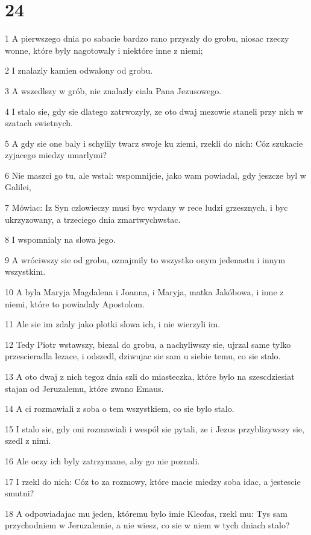 \chapter{24}

\par 1 A pierwszego dnia po sabacie bardzo rano przyszly do grobu, niosac rzeczy wonne, które byly nagotowaly i niektóre inne z niemi;
\par 2 I znalazly kamien odwalony od grobu.
\par 3 A wszedlszy w grób, nie znalazly ciala Pana Jezusowego.
\par 4 I stalo sie, gdy sie dlatego zatrwozyly, ze oto dwaj mezowie staneli przy nich w szatach swietnych.
\par 5 A gdy sie one baly i schylily twarz swoje ku ziemi, rzekli do nich: Cóz szukacie zyjacego miedzy umarlymi?
\par 6 Nie maszci go tu, ale wstal: wspomnijcie, jako wam powiadal, gdy jeszcze byl w Galilei,
\par 7 Mówiac: Iz Syn czlowieczy musi byc wydany w rece ludzi grzesznych, i byc ukrzyzowany, a trzeciego dnia zmartwychwstac.
\par 8 I wspomnialy na slowa jego.
\par 9 A wróciwszy sie od grobu, oznajmily to wszystko onym jedenastu i innym wszystkim.
\par 10 A byla Maryja Magdalena i Joanna, i Maryja, matka Jakóbowa, i inne z niemi, które to powiadaly Apostolom.
\par 11 Ale sie im zdaly jako plotki slowa ich, i nie wierzyli im.
\par 12 Tedy Piotr wstawszy, biezal do grobu, a nachyliwszy sie, ujrzal same tylko przescieradla lezace, i odszedl, dziwujac sie sam u siebie temu, co sie stalo.
\par 13 A oto dwaj z nich tegoz dnia szli do miasteczka, które bylo na szescdziesiat stajan od Jeruzalemu, które zwano Emaus.
\par 14 A ci rozmawiali z soba o tem wszystkiem, co sie bylo stalo.
\par 15 I stalo sie, gdy oni rozmawiali i wespól sie pytali, ze i Jezus przyblizywszy sie, szedl z nimi.
\par 16 Ale oczy ich byly zatrzymane, aby go nie poznali.
\par 17 I rzekl do nich: Cóz to za rozmowy, które macie miedzy soba idac, a jestescie smutni?
\par 18 A odpowiadajac mu jeden, któremu bylo imie Kleofas, rzekl mu: Tys sam przychodniem w Jeruzalemie, a nie wiesz, co sie w niem w tych dniach stalo?
